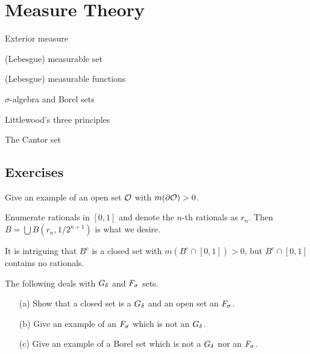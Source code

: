\chapter{Measure Theory}

\begin{introduction}
  \item Exterior measure
  \item (Lebesgue) measurable set
  \item (Lebesgue) measurable functions
  \item $\sigma$-algebra and Borel sets
  \item Littlewood's three principles
  \item The Cantor set
\end{introduction}

\section{Exercises}

\begin{Exercise}
  Give an example of an open set $\mathcal{O}$ with $m(\partial\mathcal{O})>0$.
\end{Exercise}

\begin{hint}
  Enumerate rationals in $[0,1]$ and denote the $n$-th rationals as $r_n$. Then $B=\bigcup B(r_n,1/2^{n+1})$ is what we desire.
\end{hint}
\begin{note}
  It is intriguing that $B^c$ is a closed set with $m(B^c\cap[0,1])>0$, but $B^c\cap[0,1]$ contains no rationals.
\end{note}

\begin{Exercise}[13]
  The following deals with $G_\delta$ and $F_\sigma$ sets.
  \begin{itemize}
    \item [(a)] Show that a closed set is a $G_\delta$ and an open set an $F_\sigma$.
    \item [(b)] Give an example of an $F_\sigma$ which is not an $G_\delta$.
    \item [(c)] Give an example of a Borel set which is not a $G_\delta$ nor an $F_\sigma$.
  \end{itemize}
\end{Exercise}

